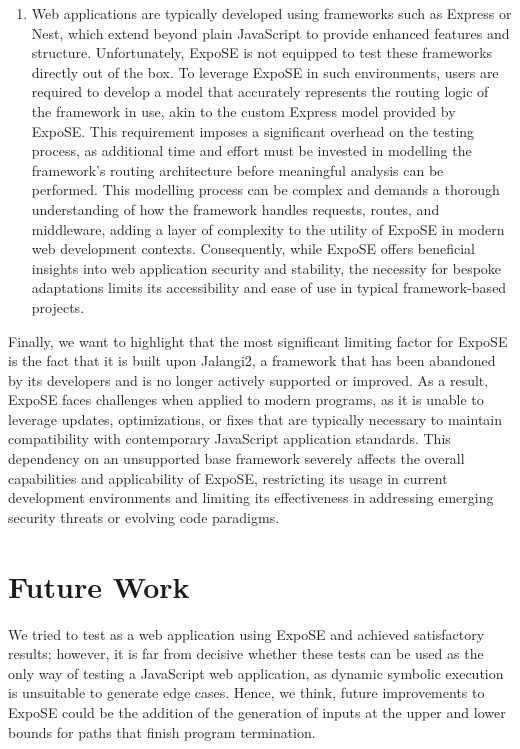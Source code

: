 \begin{enumerate}
    \item Web applications are typically developed using frameworks such as Express or Nest, which extend beyond plain JavaScript to provide enhanced features and structure. Unfortunately, ExpoSE is not equipped to test these frameworks directly out of the box. To leverage ExpoSE in such environments, users are required to develop a model that accurately represents the routing logic of the framework in use, akin to the custom Express model provided by ExpoSE.
    This requirement imposes a significant overhead on the testing process, as additional time and effort must be invested in modelling the framework's routing architecture before meaningful analysis can be performed. This modelling process can be complex and demands a thorough understanding of how the framework handles requests, routes, and middleware, adding a layer of complexity to the utility of ExpoSE in modern web development contexts. Consequently, while ExpoSE offers beneficial insights into web application security and stability, the necessity for bespoke adaptations limits its accessibility and ease of use in typical framework-based projects.

\end{enumerate}

Finally, we want to highlight that the most significant limiting factor for ExpoSE is the fact that it is built upon Jalangi2, a framework that has been abandoned by its developers and is no longer actively supported or improved. As a result, ExpoSE faces challenges when applied to modern programs, as it is unable to leverage updates, optimizations, or fixes that are typically necessary to maintain compatibility with contemporary JavaScript application standards. This dependency on an unsupported base framework severely affects the overall capabilities and applicability of ExpoSE, restricting its usage in current development environments and limiting its effectiveness in addressing emerging security threats or evolving code paradigms.




\section{Future Work}
\label{sec:ft-research}

We tried to test as a web application using ExpoSE and achieved satisfactory results; however, it is far from decisive whether these tests can be used as the only way of testing a JavaScript web application, as dynamic symbolic execution is unsuitable to generate edge cases. Hence, we think, future improvements to ExpoSE could be the addition of the generation of inputs at the upper and lower bounds for paths that finish program termination.

